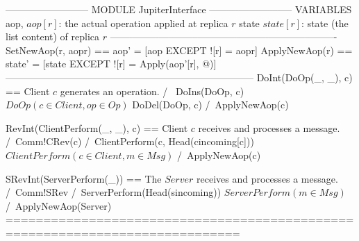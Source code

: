 \documentclass{article}
\begin{document}
\begin{tla}
-------------------------- MODULE JupiterInterface --------------------------
VARIABLES aop,  \* $aop[r]$: the actual operation applied at replica $r$
          state \* $state[r]$: state (the list content) of replica $r$
----------------------------------------------------------------------
SetNewAop(r, aopr) == aop' = [aop EXCEPT ![r] = aopr]
ApplyNewAop(r) == state' = [state EXCEPT ![r] = Apply(aop'[r], @)]
-----------------------------------------------------------------------------
DoInt(DoOp(_, _), c) == \* Client $c$ generates an operation.
    /\ \/ DoIns(DoOp, c)\* $DoOp(c \in Client, op \in Op)$
       \/ DoDel(DoOp, c)
    /\ ApplyNewAop(c)
    
RevInt(ClientPerform(_, _), c) == \* Client $c$ receives and processes a message.
    /\ Comm!CRev(c)
    /\ ClientPerform(c, Head(cincoming[c])) \* $ClientPerform(c \in Client, m \in Msg)$
    /\ ApplyNewAop(c)

SRevInt(ServerPerform(_)) == \* The $Server$ receives and processes a message.
    /\ Comm!SRev
    /\ ServerPerform(Head(sincoming)) \* $ServerPerform(m \in Msg)$
    /\ ApplyNewAop(Server)
=============================================================================
\end{tla}
\end{document}
